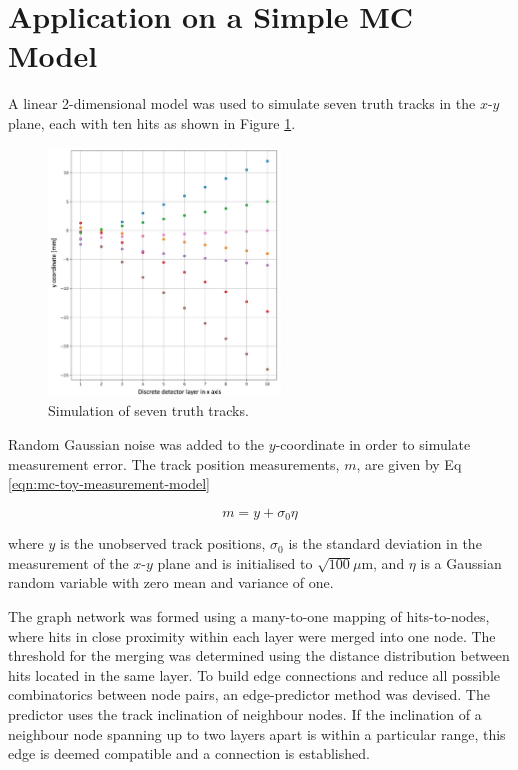 \section{Application on a Simple MC Model}
\label{gnn-application-toy-model}

A linear 2-dimensional model was used to simulate seven truth tracks in the $x$-$y$ plane, each with ten hits as shown in Figure \ref{fig:ground-truth}. 

\begin{figure}[htbp]
    \centering
    \includegraphics[width=0.55\textwidth]{images/5-gnn-algorithm/ground-truth.png}
    \caption{Simulation of seven truth tracks.}
    \label{fig:ground-truth}%
\end{figure}

Random Gaussian noise was added to the $y$-coordinate in order to simulate measurement error. The track position measurements, $m$, are given by Eq \eqref{eqn:mc-toy-measurement-model}

\begin{equation}
m = y + \sigma_0 \eta
\label{eqn:mc-toy-measurement-model}
\end{equation}

where $y$ is the unobserved track positions, $\sigma_0$ is the standard deviation in the measurement of the $x$-$y$ plane and is initialised to $\sqrt{100} \mu $m, and $\eta$ is a Gaussian random variable with zero mean and variance of one.

The graph network was formed using a many-to-one mapping of hits-to-nodes, where hits in close proximity within each layer were merged into one node. The threshold for the merging was determined using the distance distribution between hits located in the same layer. To build edge connections and reduce all possible combinatorics between node pairs, an edge-predictor method was devised. The predictor uses the track inclination of neighbour nodes. If the inclination of a neighbour node spanning up to two layers apart is within a particular range, this edge is deemed compatible and a connection is established. 

